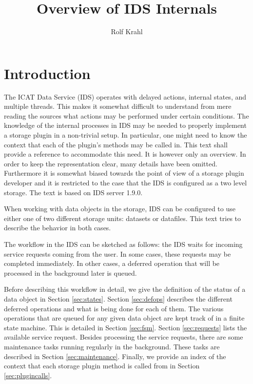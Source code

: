 \documentclass[paper=a4]{scrartcl}
\title{Overview of IDS Internals}
\author{Rolf Krahl}
\begin{document}
\maketitle

\section{Introduction}

The ICAT Data Service (IDS) operates with delayed actions, internal 
states, and multiple threads. This makes it somewhat difficult to
understand from mere reading the sources what actions may be performed
under certain conditions. The knowledge of the internal processes in
IDS may be needed to properly implement a storage plugin in a
non-trivial setup. In particular, one might need to know the context
that each of the plugin's methods may be called in. This text shall
provide a reference to accommodate this need. It is however only an
overview. In order to keep the representation clear, many details
have been omitted. Furthermore it is somewhat biased towards the
point of view of a storage plugin developer and it is restricted to
the case that the IDS is configured as a two level storage. The text
is based on IDS server 1.9.0.

When working with data objects in the storage, IDS can be configured
to use either one of two different storage units: datasets or
datafiles. This text tries to describe the behavior in both cases.

The workflow in the IDS can be sketched as follows: the IDS waits for
incoming service requests coming from the user. In some cases, these
requests may be completed immediately. In other cases, a deferred
operation that will be processed in the background later is queued.

Before describing this workflow in detail, we give the definition of
the status of a data object in Section \ref{sec:states}. Section
\ref{sec:defops} describes the different deferred operations and what
is being done for each of them. The various operations that are
queued for any given data object are kept track of in a finite state
machine. This is detailed in Section \ref{sec:fsm}. Section
\ref{sec:requests} lists the available service request. Besides
processing the service requests, there are some maintenance tasks
running regularly in the background. These tasks are described in
Section \ref{sec:maintenance}. Finally, we provide an index of the
context that each storage plugin method is called from in Section
\ref{sec:plugincalls}.
\end{document}
